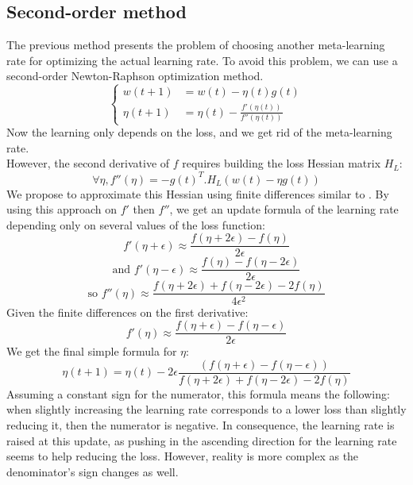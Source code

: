 \documentclass{article}
\begin{document}
  \subsection{Second-order method}
  
  The previous method presents the problem of choosing another meta-learning rate for optimizing the actual learning rate. To avoid this problem, we can use a second-order Newton-Raphson optimization method. \\
  $$
  \left\{
  \begin{array}{lll}
  w(t+1) &= w(t) -\eta(t)g(t)\\
  \eta(t+1) &= \eta(t) - \frac{f'(\eta(t))}{f''(\eta(t))}
  \end{array}
  \right.
  $$
  Now the learning only depends on the loss, and we get rid of the meta-learning rate. \\
  However, the second derivative of $f$ requires building the loss Hessian matrix $H_{L}$:\\
  \begin{equation}
  \forall \eta, f''(\eta) = -g(t)^{T}.H_{L}(w(t)-\eta g(t))
  \end{equation}
  We propose to approximate this Hessian using finite differences similar to \cite{martens2010deep}. By using this approach on $f'$ then $f''$, we get an update formula of the learning rate depending only on several values of the loss function:\\
  \begin{equation}
  f'(\eta+\epsilon) \approx \frac{f(\eta + 2\epsilon)-f(\eta)}{2\epsilon}
  \end{equation}
  \begin{equation}
  \text{and }f'(\eta-\epsilon) \approx \frac{f(\eta)-f(\eta-2\epsilon)}{2\epsilon}
  \end{equation}  
  \begin{equation}
  \text{so }f''(\eta) \approx \frac{f(\eta+2\epsilon)+f(\eta-2\epsilon)-2f(\eta)}{4 \epsilon^{2}}
  \end{equation}
  Given the finite differences on the first derivative:\\    
  \begin{equation}
  f'(\eta) \approx \frac{f(\eta+\epsilon)-f(\eta-\epsilon)}{2 \epsilon}
  \end{equation}
  We get the final simple formula for $\eta$:\\
  \begin{equation}
  \eta(t+1) = \eta(t) - 2\epsilon\frac{(f(\eta+\epsilon)-f(\eta-\epsilon))}{f(\eta+2\epsilon)+f(\eta-2\epsilon)-2f(\eta)}
  \end{equation}    
  Assuming a constant sign for the numerator, this formula means the following: when slightly increasing the learning rate corresponds to a lower loss than slightly reducing it, then the numerator is negative. In consequence, the learning rate is raised at this update, as pushing in the ascending direction for the learning rate seems to help reducing the loss. However, reality is more complex as the denominator's sign changes as well. 
\end{document}

